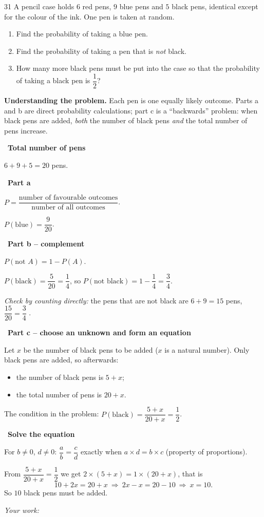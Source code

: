 \documentclass[11pt]{article}
\newif\ifsol \solfalse
\newenvironment{probbox}[2]{\begin{probboxT}{#1}{#2}}{\end{probboxT}}
\newcommand{\StuProb}[2]{\begin{probboxS}{#1}{#2}\StuProbBody\end{probboxS}}
\newcommand{\probsol}[1]{%
  \begin{lrbox}{\solmeasure}\begin{minipage}{\dimexpr\linewidth-24pt\relax}#1\end{minipage}\end{lrbox}%
  \ifsol
    \begin{solbox}#1\end{solbox}%
  \else
    \setlength{\solht}{\dimexpr\ht\solmeasure+\dp\solmeasure+0.85cm\relax}%
    \ifdim\solht<1.35cm\setlength{\solht}{1.35cm}\fi
    \ifdim\solht>\StudentMaxWork\setlength{\solht}{\StudentMaxWork}\fi
    \par\noindent\begin{minipage}{\linewidth}%
    \expandafter\StuProb\StuProbArgs
    \begin{tcolorbox}[colback=white,colframe=Line,boxrule=0.8pt,arc=5pt,
      left=8pt,right=8pt,top=4pt,bottom=4pt,height=\solht]{\footnotesize\color{Slate}\itshape\WorkWord}\end{tcolorbox}%
    \end{minipage}\par\medskip
  \fi}
\newlength{\StudentMaxWork}\setlength{\StudentMaxWork}{4.5cm}
\newcommand{\step}[2]{\par\smallskip\noindent{\bfseries\color{tmBlue!85!black}\StepWord~#1.}\ {\bfseries #2}\par\nopagebreak}
\def\WorkWord{Your work:}
\def\StepWord{Step}
\begin{document}
\begin{probbox}{31}{\relax}
A pencil case holds $6$ red pens, $9$ blue pens and $5$ black pens, identical except for the colour of the ink. One pen is taken at random.
\begin{enumerate}[label=\alph*),leftmargin=1.5em,itemsep=0pt,topsep=2pt]
\item Find the probability of taking a blue pen.
\item Find the probability of taking a pen that is \emph{not} black.
\item How many more black pens must be put into the case so that the probability of taking a black pen is $\dfrac12$?
\end{enumerate}
\end{probbox}
\probsol{
\textbf{Understanding the problem.} Each pen is one equally likely outcome. Parts a and b are direct probability calculations; part c is a ``backwards'' problem: when black pens are added, \emph{both} the number of black pens \emph{and} the total number of pens increase.
\step{1}{Total number of pens}
$6+9+5=20$ pens.
\step{2}{Part a}
\begin{recallbox}$P=\dfrac{\text{number of favourable outcomes}}{\text{number of all outcomes}}$.\end{recallbox}
$P(\text{blue})=\dfrac{9}{20}$.
\step{3}{Part b -- complement}
\begin{recallbox}$P(\text{not }A)=1-P(A)$.\end{recallbox}
$P(\text{black})=\dfrac{5}{20}=\dfrac14$, so $P(\text{not black})=1-\dfrac14=\dfrac34$.

\emph{Check by counting directly:} the pens that are not black are $6+9=15$ pens, $\dfrac{15}{20}=\dfrac34$ \checkmark.
\step{4}{Part c -- choose an unknown and form an equation}
Let $x$ be the number of black pens to be added ($x$ is a natural number). Only black pens are added, so afterwards:
\begin{itemize}[leftmargin=1.2em,itemsep=0pt,topsep=1pt]
\item the number of black pens is $5+x$;
\item the total number of pens is $20+x$.
\end{itemize}
The condition in the problem: $P(\text{black})=\dfrac{5+x}{20+x}=\dfrac12$.
\step{5}{Solve the equation}
\begin{recallbox}For $b\ne0$, $d\ne0$: $\dfrac ab=\dfrac cd$ exactly when $a\times d=b\times c$ (property of proportions).\end{recallbox}
From $\dfrac{5+x}{20+x}=\dfrac12$ we get $2\times(5+x)=1\times(20+x)$, that is
\[10+2x=20+x\ \Rightarrow\ 2x-x=20-10\ \Rightarrow\ x=10.\]
So $10$ black pens must be added.

}
\end{document}
